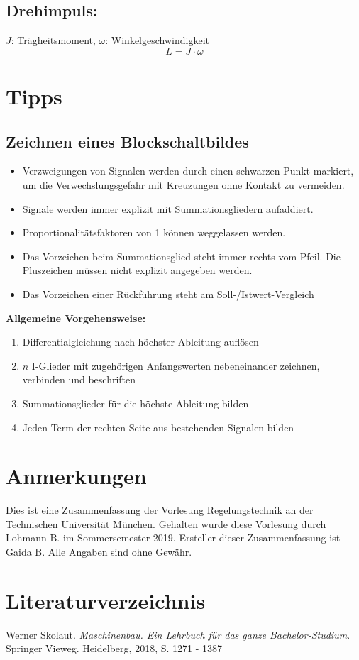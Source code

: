 \documentclass[10pt,a4paper]{article}
\begin{document}
\subsection{Drehimpuls:}
$J$: Trägheitsmoment, $\omega$: Winkelgeschwindigkeit
$$
	L = J ⋅ \omega
$$



\section{Tipps}
\subsection{Zeichnen eines Blockschaltbildes}
\begin{itemize}
	\item Verzweigungen von Signalen werden durch einen schwarzen Punkt markiert, um die Verwechslungsgefahr mit Kreuzungen ohne Kontakt zu vermeiden.
	\item Signale werden immer explizit mit Summationsgliedern aufaddiert.
	\item Proportionalitätsfaktoren von 1 können weggelassen werden.
	\item Das Vorzeichen beim Summationsglied steht immer rechts vom Pfeil. Die Pluszeichen müssen nicht explizit angegeben werden.
	\item Das Vorzeichen einer Rückführung steht am Soll-/Istwert-Vergleich
\end{itemize}
\textbf{Allgemeine Vorgehensweise:}
\begin{enumerate}
	\item Differentialgleichung nach höchster Ableitung auflösen
	\item $n$ I-Glieder mit zugehörigen Anfangswerten nebeneinander zeichnen, verbinden und beschriften
	\item Summationsglieder für die höchste Ableitung bilden
	\item Jeden Term der rechten Seite aus bestehenden Signalen bilden
\end{enumerate}






\pagebreak
\section*{Anmerkungen}
Dies ist eine Zusammenfassung der Vorlesung Regelungstechnik an der Technischen Universität München.
Gehalten wurde diese Vorlesung durch Lohmann B. im Sommersemester 2019.
Ersteller dieser Zusammenfassung ist Gaida B.
Alle Angaben sind ohne Gewähr.


\section*{Literaturverzeichnis}
Werner Skolaut. \textit{Maschinenbau. Ein Lehrbuch für das ganze Bachelor-Studium}. Springer Vieweg. Heidelberg, 2018, S. 1271 - 1387
\end{document}

